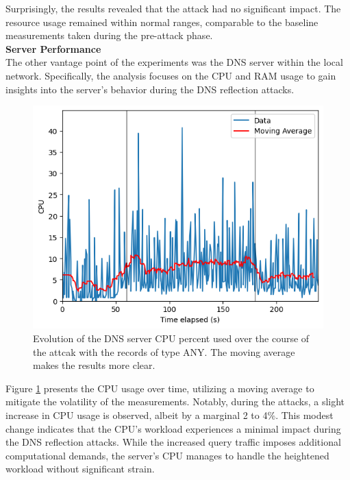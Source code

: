 Surprisingly, the results revealed that the attack had no significant impact. The resource usage remained within normal ranges, comparable to the baseline measurements taken during the pre-attack phase.\\
\noindent \textbf{Server Performance}\\
The other vantage point of the experiments was the DNS server within the local network. Specifically, the analysis focuses on the CPU and RAM usage to gain insights into the server's behavior during the DNS reflection attacks.
\begin{figure}[H]
    \centering
    \includegraphics[width=\columnwidth]{Sections/Images/Server_CPU_ANY10.png}
    \caption{Evolution of the DNS server CPU percent used over the course of the attcak with the records of type ANY. The moving average makes the results more clear.}
    \label{fig:Server_CPU1}
\end{figure}
\noindent Figure \ref{fig:Server_CPU1} presents the CPU usage over time, utilizing a moving average to mitigate the volatility of the measurements. Notably, during the attacks, a slight increase in CPU usage is observed, albeit by a marginal 2 to 4\%. This modest change indicates that the CPU's workload experiences a minimal impact during the DNS reflection attacks. While the increased query traffic imposes additional computational demands, the server's CPU manages to handle the heightened workload without significant strain. \\
